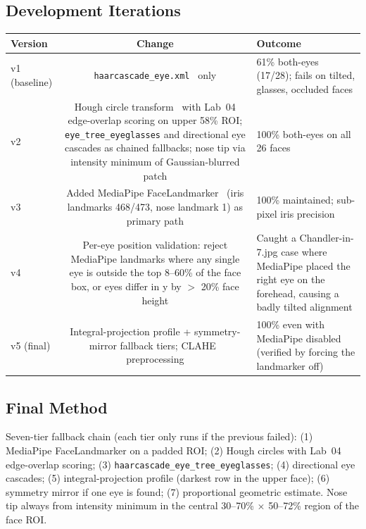 \subsection{Development Iterations}
\noindent
\begin{tabularx}{\linewidth}{@{}V C O@{}}
\toprule
\textbf{Version} & \textbf{Change} & \textbf{Outcome} \\
\midrule
v1 (baseline) & \texttt{haarcascade\_eye.xml}~\citep{viola2001rapid} only
              & 61\% both-eyes (17/28); fails on tilted, glasses, occluded faces \\
v2 & Hough circle transform~\citep{yuen1990hough} with Lab~04 edge-overlap
     scoring on upper 58\% ROI; \texttt{eye\_tree\_eyeglasses} and directional
     eye cascades as chained fallbacks; nose tip via intensity minimum of
     Gaussian-blurred patch
   & 100\% both-eyes on all 26 faces \\
v3 & Added MediaPipe FaceLandmarker~\citep{lugaresi2019mediapipe} (iris
     landmarks 468/473, nose landmark 1) as primary path
   & 100\% maintained; sub-pixel iris precision \\
v4 & Per-eye position validation: reject MediaPipe landmarks where any single
     eye is outside the top 8--60\% of the face box, or eyes differ in y by
     $>$ 20\% face height
   & Caught a Chandler-in-7.jpg case where MediaPipe placed the right eye on
     the forehead, causing a badly tilted alignment \\
v5 (final) & Integral-projection profile + symmetry-mirror fallback tiers;
             CLAHE~\citep{zuiderveld1994clahe} preprocessing
           & 100\% even with MediaPipe disabled (verified by forcing the
             landmarker off) \\
\bottomrule
\end{tabularx}

\subsection{Final Method}
Seven-tier fallback chain (each tier only runs if the previous failed):
(1) MediaPipe FaceLandmarker on a padded ROI;
(2) Hough circles with Lab~04 edge-overlap scoring;
(3) \texttt{haarcascade\_eye\_tree\_eyeglasses};
(4) directional eye cascades;
(5) integral-projection profile (darkest row in the upper face);
(6) symmetry mirror if one eye is found;
(7) proportional geometric estimate.
Nose tip always from intensity minimum in the central 30--70\% $\times$ 50--72\%
region of the face ROI.

